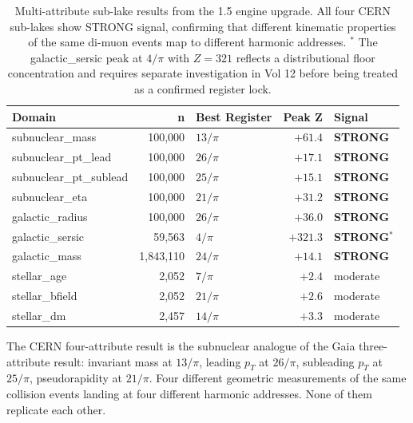 \documentclass[11pt, letterpaper, openany]{book}
\begin{document}
\begin{table}[H]
\centering
\renewcommand{\arraystretch}{1.4}
\small
\begin{tabular}{|l|r|l|r|l|}
\hline
\rowcolor{kishblue!10}
\textbf{Domain} & \textbf{n} & \textbf{Best Register} & \textbf{Peak Z} & \textbf{Signal} \\
\hline\hline
\rowcolor{subnucleargold!8}
subnuclear\_mass     & 100,000 & $13/\pi$ & $+61.4$ & \textbf{STRONG} \\
\rowcolor{subnucleargold!6}
subnuclear\_pt\_lead & 100,000 & $26/\pi$ & $+17.1$ & \textbf{STRONG} \\
\rowcolor{subnucleargold!5}
subnuclear\_pt\_sublead & 100,000 & $25/\pi$ & $+15.1$ & \textbf{STRONG} \\
\rowcolor{subnucleargold!4}
subnuclear\_eta      & 100,000 & $21/\pi$ & $+31.2$ & \textbf{STRONG} \\
\hline
\rowcolor{gray!5}
galactic\_radius     & 100,000 & $26/\pi$ & $+36.0$ & \textbf{STRONG} \\
\rowcolor{gray!4}
galactic\_sersic     & 59,563  & $4/\pi$  & $+321.3$ & \textbf{STRONG}$^*$ \\
\rowcolor{kishblue!5}
galactic\_mass       & 1,843,110 & $24/\pi$ & $+14.1$ & \textbf{STRONG} \\
\hline
\rowcolor{goldseal!5}
stellar\_age         & 2,052  & $7/\pi$  & $+2.4$  & moderate \\
\rowcolor{goldseal!5}
stellar\_bfield      & 2,052  & $21/\pi$ & $+2.6$  & moderate \\
\rowcolor{goldseal!5}
stellar\_dm          & 2,457  & $14/\pi$ & $+3.3$  & moderate \\
\hline
\end{tabular}
\caption{Multi-attribute sub-lake results from the 1.5 engine upgrade. All four
CERN sub-lakes show STRONG signal, confirming that different kinematic properties
of the same di-muon events map to different harmonic addresses.
$^*$ The galactic\_sersic peak at $4/\pi$ with $Z=321$ reflects a distributional
floor concentration and requires separate investigation in Vol 12 before
being treated as a confirmed register lock.}
\label{tab:multiattr_results}
\end{table}

The CERN four-attribute result is the subnuclear analogue of the Gaia
three-attribute result: invariant mass at $13/\pi$, leading $p_T$ at $26/\pi$,
subleading $p_T$ at $25/\pi$, pseudorapidity at $21/\pi$. Four different
geometric measurements of the same collision events landing at four different
harmonic addresses. None of them replicate each other.
\end{document}
